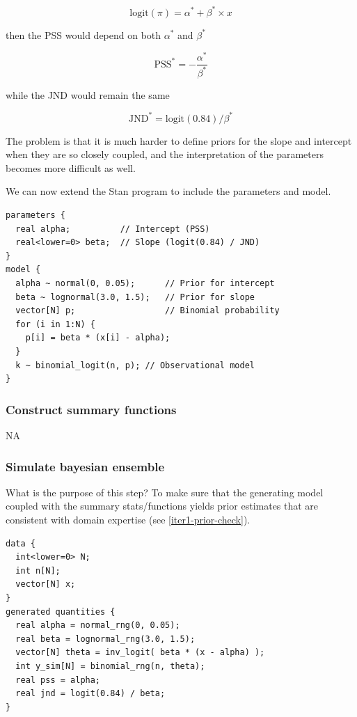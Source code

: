 \documentclass[11pt, oneside, openany]{scrbook}
\begin{document}
\[
\mathrm{logit}(\pi) = \alpha^* + \beta^* \times x
\]

then the PSS would depend on both \(\alpha^*\) and \(\beta^*\)

\[
\mathrm{PSS}^* = -\frac{\alpha^*}{\beta^*}
\]

while the JND would remain the same

\[
\mathrm{JND}^* = \mathrm{logit}(0.84)/\beta^*
\]

The problem is that it is much harder to define priors for the slope and intercept when they are so closely coupled, and the interpretation of the parameters becomes more difficult as well.

We can now extend the Stan program to include the parameters and model.


\begin{verbatim}
parameters {
  real alpha;          // Intercept (PSS)
  real<lower=0> beta;  // Slope (logit(0.84) / JND)
}
model {
  alpha ~ normal(0, 0.05);      // Prior for intercept
  beta ~ lognormal(3.0, 1.5);   // Prior for slope
  vector[N] p;                  // Binomial probability
  for (i in 1:N) {
    p[i] = beta * (x[i] - alpha);
  }
  k ~ binomial_logit(n, p); // Observational model
}
\end{verbatim}


\hypertarget{iter1-summary-funs}{%
\subsubsection{Construct summary functions}\label{iter1-summary-funs}}

NA

\hypertarget{iter1-sim}{%
\subsubsection{Simulate bayesian ensemble}\label{iter1-sim}}

What is the purpose of this step? To make sure that the generating model coupled with the summary stats/functions yields prior estimates that are consistent with domain expertise (see \ref{iter1-prior-check}).


\begin{verbatim}
data {
  int<lower=0> N;
  int n[N];
  vector[N] x;
}
generated quantities {
  real alpha = normal_rng(0, 0.05);
  real beta = lognormal_rng(3.0, 1.5);
  vector[N] theta = inv_logit( beta * (x - alpha) );
  int y_sim[N] = binomial_rng(n, theta);
  real pss = alpha;
  real jnd = logit(0.84) / beta;
}
\end{verbatim}
\end{document}
